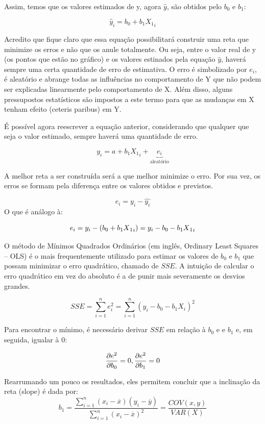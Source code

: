 \documentclass[
]{book}
\begin{document}
Assim, temos que os valores estimados de y, agora \(\hat{y}\), são obtidos pelo \(b_0\) e \(b_1\):

\[\hat{y}_i = b_0 + b_1X{_1}_i\]

Acredito que fique claro que essa equação possibilitará construir uma reta que minimize os erros e não que os anule totalmente. Ou seja, entre o valor real de y (os pontos que estão no gráfico) e os valores estinados pela equação \(\hat{y}\), haverá sempre uma certa quantidade de erro de estimativa. O erro é simbolizado por \(e_i\), é aleatório e abrange todas as influências no comportamento de Y que não podem ser explicadas linearmente pelo comportamento de X. Além disso, alguns pressupostos estatísticos são impostos a este termo para que as mudanças em X tenham efeito (ceteris paribus) em Y.

É possível agora reescrever a equação anterior, considerando que qualquer que seja o valor estimado, sempre haverá uma quantidade de erro.

\[y_i = a + b_1X{_1}_i+\underbrace{e_i}_\text{aleatório}\]

A melhor reta a ser construída será a que melhor minimize o erro. Por sua vez, os erros se formam pela diferença entre os valores obtidos e previstos.

\[e_i = y_i - \hat{y_i}\]
O que é análogo à:

\[e_i = y_i - (b_0 + b_1X{_1}_i) \\ =  y_i - b_0 - b_1X{_1}_i\]

O método de Mínimos Quadrados Ordinários (em inglês, Ordinary Least Squares -- OLS) é o mais frequentemente utilizado para estimar os valores de \(b_0\) e \(b_1\) que possam minimizar o erro quadrático, chamado de \(SSE\). A intuição de calcular o erro quadrático em vez do absoluto é a de punir mais severamente os desvios grandes.

\[SSE = \sum_{i=1}^n e_i^2 = \sum_{i=1}^n (y_i - b_0 - b_1 X_i)^2\]

Para encontrar o mínimo, é necessário derivar \(SSE\) em relação à \(b_0\) e e \(b_1\) e, em seguida, igualar à 0:

\[\frac{\partial e^2}{\partial b_0}  = 0,\\ \frac{\partial e^2}{\partial b_1} = 0\]

Rearrumando um pouco os resultados, eles permitem concluir que a inclinação da reta (slope) é dada por:
\[b_1=\frac{\sum\limits_{i=1}^{n} (x_i-\overline{x}) (y_i-\overline{y})}{\sum\limits_{i=1}^{n} (x_i-\overline{x})^2} = \frac{COV(x,y)}{VAR(X)}\]
\end{document}
